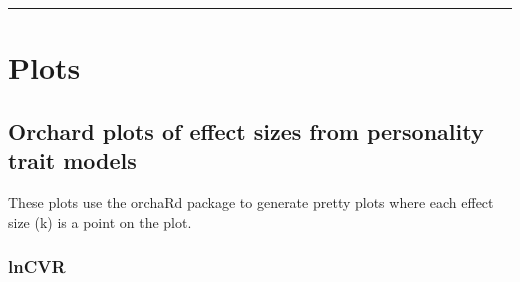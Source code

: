 \documentclass[]{article}
\begin{document}
\begin{center}\rule{0.5\linewidth}{0.5pt}\end{center}

\section{Plots}\label{plots}

\subsection{Orchard plots of effect sizes from personality trait
models}\label{orchard-plots-of-effect-sizes-from-personality-trait-models}

These plots use the orchaRd package to generate pretty plots where each
effect size (k) is a point on the plot.

\subsubsection{lnCVR}\label{lncvr}
\end{document}
